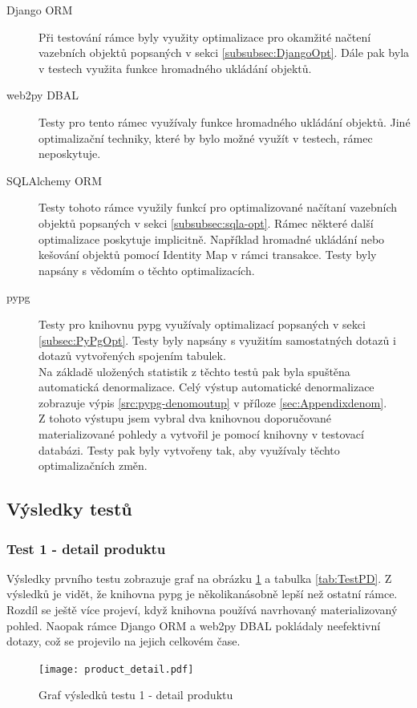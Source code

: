 \documentclass[ing,male,java,dept456]{diploma}						%
\begin{document}
\begin{description}
\item[Django ORM] Při testování rámce byly využity optimalizace pro okamžité načtení vazebních objektů popsaných v sekci \ref{subsubsec:DjangoOpt}. Dále pak byla v testech využita funkce hromadného ukládání objektů.
\item[web2py DBAL] Testy pro tento rámec využívaly funkce hromadného ukládání objektů. Jiné optimalizační techniky, které by bylo možné využít v testech, rámec neposkytuje.
\item[SQLAlchemy ORM] Testy tohoto rámce využily funkcí pro optimalizované načítaní vazebních objektů popsaných v sekci \ref{subsubsec:sqla-opt}. Rámec některé další optimalizace poskytuje implicitně. Například hromadné ukládání nebo kešování objektů pomocí Identity Map v rámci transakce. Testy byly napsány s vědomím o těchto optimalizacích.
\item[pypg] Testy pro knihovnu pypg využívaly optimalizací popsaných v sekci \ref{subsec:PyPgOpt}. Testy byly napsány s využitím samostatných dotazů i dotazů vytvořených spojením tabulek. \\
Na základě uložených statistik z těchto testů pak byla spuštěna automatická denormalizace. Celý výstup automatické denormalizace zobrazuje výpis \ref{src:pypg-denomoutup} v příloze \ref{sec:Appendixdenom}. \\
Z tohoto výstupu jsem vybral dva knihovnou doporučované materializované pohledy a vytvořil je pomocí knihovny v testovací databázi. Testy pak byly vytvořeny tak, aby využívaly těchto optimalizačních změn.
\end{description}

\subsection{Výsledky testů}

\subsubsection{Test 1 - detail produktu}
Výsledky prvního testu zobrazuje graf na obrázku \ref{fig:TestPD} a tabulka \ref{tab:TestPD}. Z výsledků je vidět, že knihovna pypg je několikanásobně lepší než ostatní rámce. Rozdíl se ještě více projeví, když knihovna používá navrhovaný materializovaný pohled. Naopak rámce Django ORM a web2py DBAL pokládaly neefektivní dotazy, což se projevilo na jejich celkovém čase. 

\begin{figure}[h!]
    \centering
    \texttt{[image: product\_detail.pdf]}
    \caption{Graf výsledků testu 1 - detail produktu}
    \label{fig:TestPD}
\end{figure}
\end{document}
